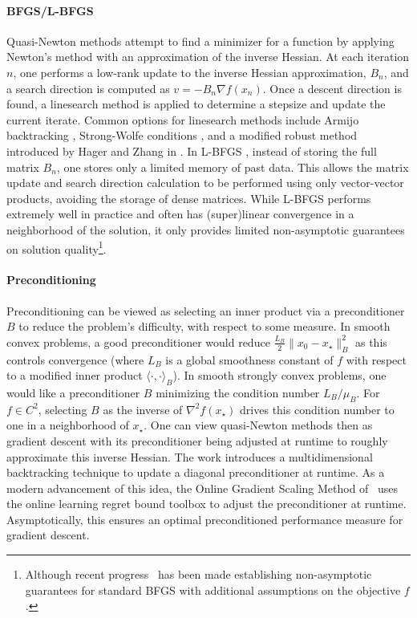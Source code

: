\documentclass[11pt]{article}
\numberwithin{equation}{section}
\theoremstyle{definition}
\theoremstyle{plain}
\theoremstyle{definition}
\begin{document}
\paragraph{BFGS/L-BFGS}
Quasi-Newton methods \cite{BFGS-B,BFGS-F,BFGS-G,BFGS-S,LBFGS_Nocedal,LBFGSB_Zhu,oLBFGS_Schraudloph} attempt to find a minimizer for a function by applying Newton's method with an approximation of the inverse Hessian. At each iteration $n$, one performs a low-rank update to the inverse Hessian approximation, $B_n$, and a search direction is computed as $v = -B_n \nabla f(x_n)$. Once a descent direction is found, a linesearch method is applied to determine a stepsize and update the current iterate. Common options for linesearch methods include Armijo backtracking \cite{Armijo,NocedalWright}, Strong-Wolfe conditions \cite{Wolfe,NocedalWright}, and a modified robust method introduced by Hager and Zhang in \cite{HagerZhang}. In L-BFGS \cite{LBFGS_Nocedal}, instead of storing the full matrix $B_n$, one stores only a limited memory of past data. This allows the matrix update and search direction calculation to be performed using only vector-vector products, avoiding the storage of dense matrices. While L-BFGS performs extremely well in practice and often has (super)linear convergence in a neighborhood of the solution, it only provides limited non-asymptotic guarantees on solution quality\footnote{Although recent progress~\cite{Jin_BFGS,Rodomanov_BFGS,Jin_BFGS_SelfConcordant} has been made establishing non-asymptotic guarantees for standard BFGS with additional assumptions on the objective $f$.}.


\paragraph{Preconditioning}
Preconditioning can be viewed as selecting an inner product via a preconditioner $B$ to reduce the problem's difficulty, with respect to some measure. In smooth convex problems, a good preconditioner would reduce $ \frac{L_B}{2}\|x_0-x_\star\|_B^2$ as this controls convergence (where $L_B$ is a global smoothness constant of $f$ with respect to a modified inner product $\langle\cdot,\cdot\rangle_B$). In smooth strongly convex problems, one would like a preconditioner $B$ minimizing the condition number $L_B/\mu_B$. For $f\in C^2$, selecting $B$ as the inverse of $\nabla^2 f(x_\star)$ drives this condition number to one in a neighborhood of $x_\star$. One can view quasi-Newton methods then as gradient descent with its preconditioner being adjusted at runtime to roughly approximate this inverse Hessian. The work \cite{MultidimensionalBacktracking_Kunstner} introduces a multidimensional backtracking technique to update a diagonal preconditioner at runtime. As a modern advancement of this idea, the Online Gradient Scaling Method of~\cite{OnlineScaling_Gao,OSGMBest} uses the online learning regret bound toolbox to adjust the preconditioner at runtime. Asymptotically, this ensures an optimal preconditioned performance measure for gradient descent.
\end{document}
